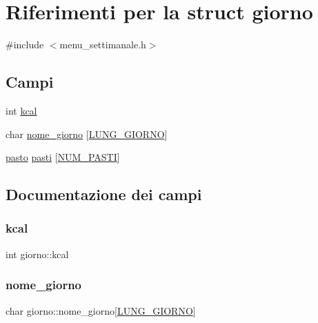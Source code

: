 \hypertarget{structgiorno}{}\section{Riferimenti per la struct giorno}
\label{structgiorno}


{\ttfamily \#include $<$menu\+\_\+settimanale.\+h$>$}

\subsection*{Campi}
\begin{DoxyCompactItemize}
\item 
int \hyperlink{structgiorno_aa711a8aca060ca1639cdf94c4452b33d}{kcal}
\item 
char \hyperlink{structgiorno_a39d726518f3a70176c8bfca309c9720b}{nome\+\_\+giorno} \mbox{[}\hyperlink{menu__settimanale_8h_a89f2bc47bf642f29f85eb025d9b096c1}{L\+U\+N\+G\+\_\+\+G\+I\+O\+R\+NO}\mbox{]}
\item 
\hyperlink{structpasto}{pasto} \hyperlink{structgiorno_a965ec0d1d5f6c22b57f8a94932350887}{pasti} \mbox{[}\hyperlink{menu__settimanale_8h_a2000ebf33ae486fb0f53926d79ae1c7f}{N\+U\+M\+\_\+\+P\+A\+S\+TI}\mbox{]}
\end{DoxyCompactItemize}


\subsection{Documentazione dei campi}
\mbox{\label{structgiorno_aa711a8aca060ca1639cdf94c4452b33d}} 
\subsubsection{\texorpdfstring{kcal}{kcal}}
{\footnotesize\ttfamily int giorno\+::kcal}

\mbox{\label{structgiorno_a39d726518f3a70176c8bfca309c9720b}} 
\subsubsection{\texorpdfstring{nome\+\_\+giorno}{nome\_giorno}}
{\footnotesize\ttfamily char giorno\+::nome\+\_\+giorno\mbox{[}\hyperlink{menu__settimanale_8h_a89f2bc47bf642f29f85eb025d9b096c1}{L\+U\+N\+G\+\_\+\+G\+I\+O\+R\+NO}\mbox{]}}

